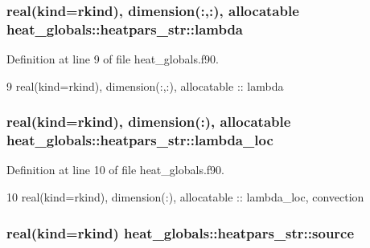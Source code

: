 \subsubsection[{lambda}]{\setlength{\rightskip}{0pt plus 5cm}real(kind=rkind), dimension(\+:,\+:), allocatable heat\+\_\+globals\+::heatpars\+\_\+str\+::lambda}\label{structheat__globals_1_1heatpars__str_a0ae525a7c1d61fd85bcaaee6226e0913}


Definition at line 9 of file heat\+\_\+globals.\+f90.


\begin{DoxyCode}
9     \textcolor{keywordtype}{real(kind=rkind)}, \textcolor{keywordtype}{dimension(:,:)}, \textcolor{keywordtype}{allocatable} :: lambda
\end{DoxyCode}
\subsubsection[{lambda\+\_\+loc}]{\setlength{\rightskip}{0pt plus 5cm}real(kind=rkind), dimension(\+:), allocatable heat\+\_\+globals\+::heatpars\+\_\+str\+::lambda\+\_\+loc}\label{structheat__globals_1_1heatpars__str_ae565066dba52a21b0976abeb22e9b9a1}


Definition at line 10 of file heat\+\_\+globals.\+f90.


\begin{DoxyCode}
10     \textcolor{keywordtype}{real(kind=rkind)}, \textcolor{keywordtype}{dimension(:)}, \textcolor{keywordtype}{allocatable} :: lambda\_loc, convection
\end{DoxyCode}
\subsubsection[{source}]{\setlength{\rightskip}{0pt plus 5cm}real(kind=rkind) heat\+\_\+globals\+::heatpars\+\_\+str\+::source}\label{structheat__globals_1_1heatpars__str_aa16257b33e279bfd6a2528f2e79a9804}


